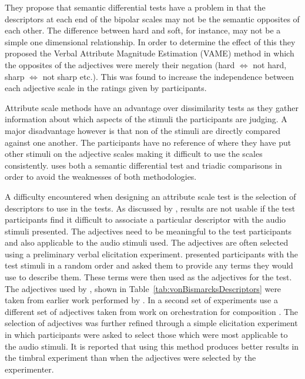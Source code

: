 			They propose that semantic differential tests have a problem in that the descriptors at each end of
			the bipolar scales may not be the semantic opposites of each other. The difference between hard and
			soft, for instance, may not be a simple one dimensional relationship. In order to determine the
			effect of this they proposed the Verbal Attribute Magnitude Estimation (VAME) method in which the
			opposites of the adjectives were merely their negation (hard $\Leftrightarrow$ not hard, sharp
			$\Leftrightarrow$ not sharp etc.). This was found to increase the independence between each
			adjective scale in the ratings given by participants. 

			Attribute scale methods have an advantage over dissimilarity tests as they gather information about
			which aspects of the stimuli the participants are judging. A major disadvantage however is that non
			of the stimuli are directly compared against one another. The participants have no reference of
			where they have put other stimuli on the adjective scales making it difficult to use the scales
			consistently. \citet{marui2005constructing} uses both a semantic differential test and triadic
			comparisons in order to avoid the weaknesses of both methodologies. 

			A difficulty encountered when designing an attribute scale test is the selection of descriptors to
			use in the tests. As discussed by \citet{darke2005assessment}, results are not usable if the test
			participants find it difficult to associate a particular descriptor with the audio stimuli
			presented. The adjectives need to be meaningful to the test participants and also applicable to the
			audio stimuli used. The adjectives are often selected using a preliminary verbal elicitation
			experiment. \citet{namba1991verbal} presented participants with the test stimuli in a random order
			and asked them to provide any terms they would use to describe them. These terms were then used as
			the adjectives for the test. The adjectives used by \citet{kendall1993verbal1}, shown in
			Table~\ref{tab:vonBismarcksDescriptors} were taken from earlier work performed by
			\citet{vonbismarck1974timbre}. In a second set of experiments \citet{kendall1993verbal2} use a
			different set of adjectives taken from work on orchestration for composition
			\citet{piston1955orchestration}. The selection of adjectives was further refined through a simple
			elicitation experiment in which participants were asked to select those which were most applicable
			to the audio stimuli. It is reported that using this method produces better results in the timbral
			experiment than when the adjectives were selected by the experimenter.

